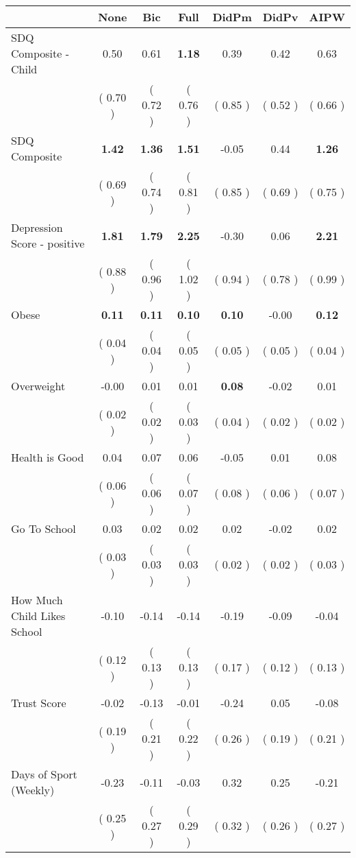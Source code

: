 \begin{tabular}{l c c c c c c}
\toprule
 & None & Bic & Full & DidPm & DidPv & AIPW \\
\midrule
SDQ Composite - Child &      0.50 &      0.61 & \textbf{      1.18 } &      0.39 &      0.42 &      0.63 \\
& (     0.70 ) & (     0.72 ) & (     0.76 ) & (     0.85 ) & (     0.52 ) & (     0.66 ) \\
SDQ Composite & \textbf{      1.42 } & \textbf{      1.36 } & \textbf{      1.51 } &     -0.05 &      0.44 & \textbf{     1.26} \\
& (     0.69 ) & (     0.74 ) & (     0.81 ) & (     0.85 ) & (     0.69 ) & (     0.75 ) \\
Depression Score - positive & \textbf{      1.81 } & \textbf{      1.79 } & \textbf{      2.25 } &     -0.30 &      0.06 & \textbf{     2.21} \\
& (     0.88 ) & (     0.96 ) & (     1.02 ) & (     0.94 ) & (     0.78 ) & (     0.99 ) \\
Obese & \textbf{      0.11 } & \textbf{      0.11 } & \textbf{      0.10 } & \textbf{      0.10 } &     -0.00 & \textbf{     0.12} \\
& (     0.04 ) & (     0.04 ) & (     0.05 ) & (     0.05 ) & (     0.05 ) & (     0.04 ) \\
Overweight &     -0.00 &      0.01 &      0.01 & \textbf{      0.08 } &     -0.02 &      0.01 \\
& (     0.02 ) & (     0.02 ) & (     0.03 ) & (     0.04 ) & (     0.02 ) & (     0.02 ) \\
Health is Good &      0.04 &      0.07 &      0.06 &     -0.05 &      0.01 &      0.08 \\
& (     0.06 ) & (     0.06 ) & (     0.07 ) & (     0.08 ) & (     0.06 ) & (     0.07 ) \\
Go To School &      0.03 &      0.02 &      0.02 &      0.02 &     -0.02 &      0.02 \\
& (     0.03 ) & (     0.03 ) & (     0.03 ) & (     0.02 ) & (     0.02 ) & (     0.03 ) \\
How Much Child Likes School &     -0.10 &     -0.14 &     -0.14 &     -0.19 &     -0.09 &     -0.04 \\
& (     0.12 ) & (     0.13 ) & (     0.13 ) & (     0.17 ) & (     0.12 ) & (     0.13 ) \\
Trust Score &     -0.02 &     -0.13 &     -0.01 &     -0.24 &      0.05 &     -0.08 \\
& (     0.19 ) & (     0.21 ) & (     0.22 ) & (     0.26 ) & (     0.19 ) & (     0.21 ) \\
Days of Sport (Weekly) &     -0.23 &     -0.11 &     -0.03 &      0.32 &      0.25 &     -0.21 \\
& (     0.25 ) & (     0.27 ) & (     0.29 ) & (     0.32 ) & (     0.26 ) & (     0.27 ) \\
\bottomrule
\end{tabular}
